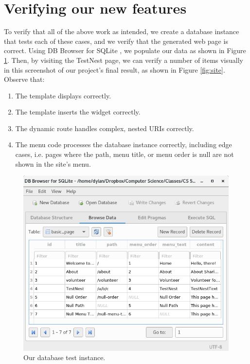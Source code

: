 \section{Verifying our new features}

To verify that all of the above work as intended, we create a database instance that tests each of these cases, and we verify that the generated web page is correct. Using DB Browser for SQLite \cite{sqliteBrowser}, we populate our data as shown in Figure \ref{fig:db}. Then, by visiting the TestNest page, we can verify a number of items visually in this screenshot of our project's final result, as shown in Figure \ref{fig:site}. Observe that:

\begin{enumerate}
  \item The template displays correctly.
  \item The template inserts the  widget correctly.
  \item The dynamic route handles complex, nested URIs correctly.
  \item The menu code processes the database instance correctly, including edge cases, i.e. pages where the path, menu title, or menu order is null are not shown in the site's menu.
\end{enumerate}

\begin{figure}[h]
  \centering
  \includegraphics[width=4.4in]{db.png}
  \caption{Our database test instance.}
  \label{fig:db}
\end{figure}


